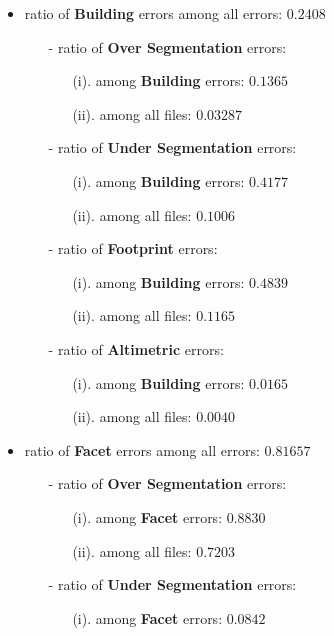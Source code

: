 \documentclass[a4paper, 11pt]{article}
\begin{document}
	\begin{itemize}
		\item ratio of \textbf{Building} errors among all errors: $0.2408$
		\begin{itemize}
			\item[-] ratio of \textbf{Over Segmentation} errors:
			\begin{itemize}
				\item[(i).] among \textbf{Building} errors:  $0.1365$
				\item[(ii).] among all files:  $0.03287$
			\end{itemize}
			\item[-] ratio of \textbf{Under Segmentation} errors:
			\begin{itemize}
				\item[(i).] among \textbf{Building} errors:  $0.4177$
				\item[(ii).] among all files:   $0.1006$
			\end{itemize}
			\item[-] ratio of \textbf{Footprint} errors:
			\begin{itemize}
				\item[(i).] among \textbf{Building} errors:  $0.4839$
				\item[(ii).] among all files:  $0.1165$
			\end{itemize}
			\item[-] ratio of \textbf{Altimetric} errors:
			\begin{itemize}
				\item[(i).] among \textbf{Building} errors:  $0.0165$
				\item[(ii).] among all files:  $0.0040$
			\end{itemize}
		\end{itemize}
		\item ratio of \textbf{Facet} errors among all errors: $0.81657$
		\begin{itemize}
			\item[-] ratio of \textbf{Over Segmentation} errors:
			\begin{itemize}
				\item[(i).] among \textbf{Facet} errors:  $0.8830$
				\item[(ii).] among all files:  $0.7203$
			\end{itemize}
			\item[-] ratio of \textbf{Under Segmentation} errors:
			\begin{itemize}
				\item[(i).] among \textbf{Facet} errors:  $0.0842$

\end{itemize}
\end{itemize}
\end{itemize}
\end{document}

